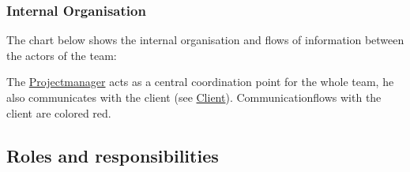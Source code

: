 \documentclass[9pt]{article}
\begin{document}
\subsubsection{Internal Organisation}\label{internal-organisation}

The chart below shows the internal organisation and flows of information
between the actors of the team:

The \hyperref[Projectmanager]{Projectmanager} acts as a central
coordination point for the whole team, he also communicates with the
client (see \hyperref[4.1.1]{Client}). Communicationflows with the
client are colored red.

\subsection{Roles and
responsibilities}\label{roles-and-responsibilities}
\end{document}
